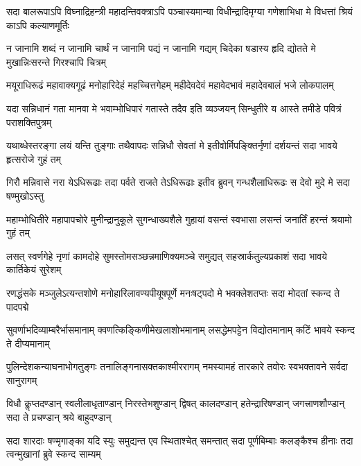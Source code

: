
\newpage
{}
\fourlineindentedshloka
{सदा बालरूपाऽपि विघ्नाद्रिहन्त्री}
{महादन्तिवक्त्राऽपि पञ्चास्यमान्या}
{विधीन्द्रादिमृग्या गणेशाभिधा मे}
{विधत्तां श्रियं काऽपि कल्याणमूर्तिः}

\fourlineindentedshloka
{न जानामि शब्दं न जानामि चार्थं}
{न जानामि पद्यं न जानामि गद्यम्}
{चिदेका षडास्य हृदि द्योतते मे}
{मुखान्निःसरन्ते गिरश्चापि चित्रम्}

\fourlineindentedshloka
{मयूराधिरूढं महावाक्यगूढं}
{मनोहारिदेहं महच्चित्तगेहम्}
{महीदेवदेवं महावेदभावं}
{महादेवबालं भजे लोकपालम्}

\fourlineindentedshloka
{यदा सन्निधानं गता मानवा मे}
{भवाम्भोधिपारं गतास्ते तदैव}
{इति व्यञ्जयन् सिन्धुतीरे य आस्ते}
{तमीडे पवित्रं पराशक्तिपुत्रम्}

\fourlineindentedshloka
{यथाब्धेस्तरङ्गा लयं यन्ति तुङ्गाः}
{तथैवापदः सन्निधौ सेवतां मे}
{इतीवोर्मिपङ्क्तिर्नृणां दर्शयन्तं}
{सदा भावये हृत्सरोजे गुहं तम्}

\fourlineindentedshloka
{गिरौ मन्निवासे नरा येऽधिरूढाः}
{तदा पर्वते राजते तेऽधिरूढाः}
{इतीव ब्रुवन् गन्धशैलाधिरूढः}
{स देवो मुदे मे सदा षण्मुखोऽस्तु}

\fourlineindentedshloka
{महाम्भोधितीरे महापापचोरे}
{मुनीन्द्रानुकूले सुगन्धाख्यशैले}
{गुहायां वसन्तं स्वभासा लसन्तं}
{जनार्तिं हरन्तं श्रयामो गुहं तम्}

\fourlineindentedshloka
{लसत् स्वर्णगेहे नृणां कामदोहे}
{सुमस्तोमसञ्छन्नमाणिक्यमञ्चे}
{समुद्यत् सहस्रार्कतुल्यप्रकाशं}
{सदा भावये कार्तिकेयं सुरेशम्}

\fourlineindentedshloka
{रणद्धंसके मञ्जुलेऽत्यन्तशोणे}
{मनोहारिलावण्यपीयूषपूर्णे}
{मनःषट्पदो मे भवक्लेशतप्तः}
{सदा मोदतां स्कन्द ते पादपद्मे}

\fourlineindentedshloka
{सुवर्णाभदिव्याम्बरैर्भासमानाम्}
{क्वणत्किङ्किणीमेखलाशोभमानाम्}
{लसद्धेमपट्टेन विद्योतमानाम्}
{कटिं भावये स्कन्द ते दीप्यमानाम्}

\fourlineindentedshloka
{पुलिन्देशकन्याघनाभोगतुङ्गः}
{तनालिङ्गनासक्तकाश्मीररागम्}
{नमस्यामहं तारकारे तवोरः}
{स्वभक्तावने सर्वदा सानुरागम्}

\fourlineindentedshloka
{विधौ कॢप्तदण्डान् स्वलीलाधृताण्डान्}
{निरस्तेभशुण्डान् द्विषत् कालदण्डान्}
{हतेन्द्रारिषण्डान् जगत्त्राणशौण्डान्}
{सदा ते प्रचण्डान् श्रये बाहुदण्डान्}

\fourlineindentedshloka
{सदा शारदाः षण्मृगाङ्का यदि स्युः}
{समुद्यन्त एव स्थिताश्चेत् समन्तात्}
{सदा पूर्णबिम्बाः कलङ्कैश्च हीनाः}
{तदा त्वन्मुखानां ब्रुवे स्कन्द साम्यम्}

